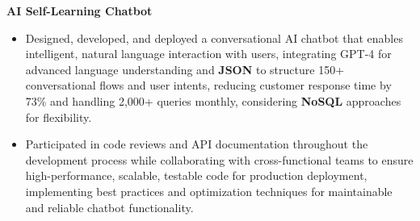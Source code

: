 \documentclass[a4paper,10pt]{article}
\begin{document}
\vspace{-2mm}
\textbf{AI Self-Learning Chatbot} \\
\begin{itemize}[leftmargin=*, itemsep=0pt, parsep=1pt]
\vspace{-7mm}
    \item Designed, developed, and deployed a conversational AI chatbot that enables intelligent, natural language interaction with users, integrating GPT-4 for advanced language understanding and \textbf{JSON} to structure 150+ conversational flows and user intents, reducing customer response time by 73\% and handling 2,000+ queries monthly, considering \textbf{NoSQL} approaches for flexibility.
    \item Participated in code reviews and API documentation throughout the development process while collaborating with cross-functional teams to ensure high-performance, scalable, testable code for production deployment, implementing best practices and optimization techniques for maintainable and reliable chatbot functionality.
\end{itemize}

\vspace{-2mm}
\end{document}
